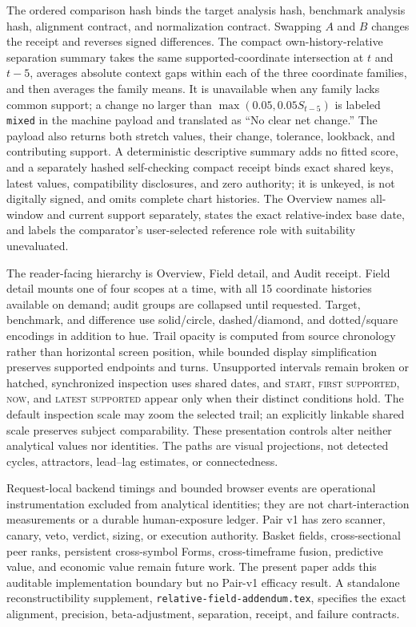 \documentclass{article}
\begin{document}
The ordered comparison hash binds the target analysis hash, benchmark analysis hash, alignment contract, and normalization contract. Swapping $A$ and $B$ changes the receipt and reverses signed differences. The compact own-history-relative separation summary takes the same supported-coordinate intersection at $t$ and $t-5$, averages absolute context gaps within each of the three coordinate families, and then averages the family means. It is unavailable when any family lacks common support; a change no larger than $\max(0.05,0.05S_{t-5})$ is labeled \texttt{mixed} in the machine payload and translated as ``No clear net change.'' The payload also returns both stretch values, their change, tolerance, lookback, and contributing support. A deterministic descriptive summary adds no fitted score, and a separately hashed self-checking compact receipt binds exact shared keys, latest values, compatibility disclosures, and zero authority; it is unkeyed, is not digitally signed, and omits complete chart histories. The Overview names all-window and current support separately, states the exact relative-index base date, and labels the comparator's user-selected reference role with suitability unevaluated.

The reader-facing hierarchy is Overview, Field detail, and Audit receipt. Field detail mounts one of four scopes at a time, with all 15 coordinate histories available on demand; audit groups are collapsed until requested. Target, benchmark, and difference use solid/circle, dashed/diamond, and dotted/square encodings in addition to hue. Trail opacity is computed from source chronology rather than horizontal screen position, while bounded display simplification preserves supported endpoints and turns. Unsupported intervals remain broken or hatched, synchronized inspection uses shared dates, and \textsc{start}, \textsc{first supported}, \textsc{now}, and \textsc{latest supported} appear only when their distinct conditions hold. The default inspection scale may zoom the selected trail; an explicitly linkable shared scale preserves subject comparability. These presentation controls alter neither analytical values nor identities. The paths are visual projections, not detected cycles, attractors, lead--lag estimates, or connectedness.

Request-local backend timings and bounded browser events are operational instrumentation excluded from analytical identities; they are not chart-interaction measurements or a durable human-exposure ledger. Pair v1 has zero scanner, canary, veto, verdict, sizing, or execution authority. Basket fields, cross-sectional peer ranks, persistent cross-symbol Forms, cross-timeframe fusion, predictive value, and economic value remain future work. The present paper adds this auditable implementation boundary but no Pair-v1 efficacy result. A standalone reconstructibility supplement, \texttt{relative-field-addendum.tex}, specifies the exact alignment, precision, beta-adjustment, separation, receipt, and failure contracts.
\end{document}
